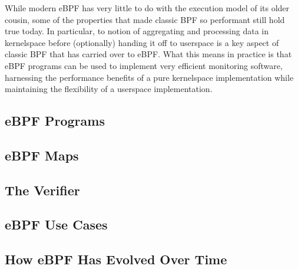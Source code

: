While modern eBPF has very little to do with the execution model of its older cousin, some
of the properties that made classic BPF so performant still hold true today. In
particular, to notion of aggregating and processing data in kernelspace before
(optionally) handing it off to userspace is a key aspect of classic BPF that has carried
over to eBPF. What this means in practice is that eBPF programs can be used to implement
very efficient monitoring software, harnessing the performance benefits of a pure
kernelspace implementation while maintaining the flexibility of a userspace
implementation.

\subsection{eBPF Programs}%
\label{ss:bpf-programs-bg}

\subsection{eBPF Maps}%
\label{ss:bpf-maps-bg}

\subsection{The Verifier}%
\label{ss:verifier-bg}

\subsection{eBPF Use Cases}%
\label{ss:ebpf-use-cases-bg}

\subsection{How eBPF Has Evolved Over Time}%
\label{ss:ebpf-evolution-bg}

